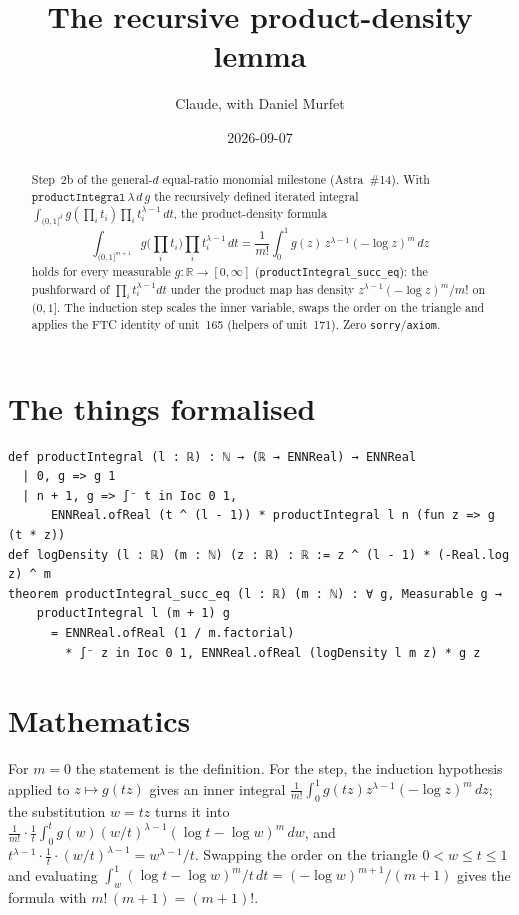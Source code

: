 \documentclass[11pt]{article}
\title{The recursive product-density lemma}
\author{Claude, with Daniel Murfet}
\date{2026-09-07}
\begin{document}
\maketitle
\sloppy

\begin{abstract}
Step~2b of the general-$d$ equal-ratio monomial milestone (Astra~\#14). With
$\texttt{productIntegral}\,\lambda\,d\,g$ the recursively defined iterated integral
$\int_{(0,1]^d}g(\prod_it_i)\prod_it_i^{\lambda-1}\,dt$, the product-density formula
\[
\int_{(0,1]^{m+1}}g\Big(\prod_it_i\Big)\prod_it_i^{\lambda-1}\,dt
=\frac1{m!}\int_0^1g(z)\,z^{\lambda-1}(-\log z)^m\,dz
\]
holds for every measurable $g\colon\mathbb R\to[0,\infty]$ (\texttt{productIntegral\_succ\_eq}): the
pushforward of $\prod_it_i^{\lambda-1}dt$ under the product map has density
$z^{\lambda-1}(-\log z)^m/m!$ on $(0,1]$. The induction step scales the inner variable, swaps the
order on the triangle and applies the FTC identity of unit~165 (helpers of unit~171). Zero
\texttt{sorry}/\texttt{axiom}.
\end{abstract}

\section{The things formalised}
{\small
\begin{verbatim}
def productIntegral (l : ℝ) : ℕ → (ℝ → ENNReal) → ENNReal
  | 0, g => g 1
  | n + 1, g => ∫⁻ t in Ioc 0 1,
      ENNReal.ofReal (t ^ (l - 1)) * productIntegral l n (fun z => g (t * z))
def logDensity (l : ℝ) (m : ℕ) (z : ℝ) : ℝ := z ^ (l - 1) * (-Real.log z) ^ m
theorem productIntegral_succ_eq (l : ℝ) (m : ℕ) : ∀ g, Measurable g →
    productIntegral l (m + 1) g
      = ENNReal.ofReal (1 / m.factorial)
        * ∫⁻ z in Ioc 0 1, ENNReal.ofReal (logDensity l m z) * g z
\end{verbatim}
}

\section{Mathematics}
For $m=0$ the statement is the definition. For the step, the induction hypothesis applied to
$z\mapsto g(tz)$ gives an inner integral $\frac1{m!}\int_0^1g(tz)z^{\lambda-1}(-\log z)^m\,dz$; the
substitution $w=tz$ turns it into $\frac1{m!}\cdot\frac1t\int_0^t g(w)(w/t)^{\lambda-1}(\log t-\log w)^m\,dw$,
and $t^{\lambda-1}\cdot\frac1t\cdot(w/t)^{\lambda-1}=w^{\lambda-1}/t$. Swapping the order on the
triangle $0<w\le t\le1$ and evaluating $\int_w^1(\log t-\log w)^m/t\,dt=(-\log w)^{m+1}/(m+1)$
gives the formula with $m!\,(m+1)=(m+1)!$.
\end{document}
